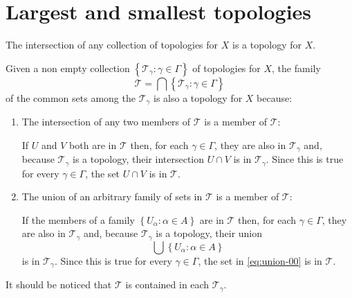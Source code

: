 \section{Largest and smallest topologies}

\begin{problem}
  The intersection of any collection of topologies for \(X\) is a topology for
  \(X\).
  \label{problem:the-intersection-of-topologies-is-again-a-topology}
\end{problem}

\begin{solution}
  Given a non empty collection
  \(\left\{\mathcal{T}_{\gamma}:\gamma\in\Gamma\right\}\) of topologies for
  \(X\), the family
  \[
    \mathcal{T}=\bigcap\left\{\mathcal{T}_{\gamma}:\gamma\in\Gamma\right\}
  \]
  of the common sets among the \(\mathcal{T}_{\gamma}\) is also a topology for
  \(X\) because:
  \begin{enumerate}
    \item
      The intersection of any two members of \(\mathcal{T}\) is a member of
      \(\mathcal{T}\):

      If \(U\) and \(V\) both are in \(\mathcal{T}\) then, for each
      \(\gamma\in\Gamma\), they are also in \(\mathcal{T}_{\gamma}\) and,
      because \(\mathcal{T}_{\gamma}\) is a topology, their intersection
      \(U\cap{V}\) is in \(\mathcal{T}_{\gamma}\). Since this is true for every
      \(\gamma\in\Gamma\), the set \(U\cap{V}\) is in \(\mathcal{T}\).

    \item
      The union of an arbitrary family of sets in \(\mathcal{T}\) is a member
      of \(\mathcal{T}\):

      If the members of a family \(\left\{U_{\alpha}:\alpha\in{A}\right\}\) are
      in \(\mathcal{T}\) then, for each \(\gamma\in\Gamma\), they are also in
      \(\mathcal{T}_{\gamma}\) and, because \(\mathcal{T}_{\gamma}\) is a
      topology, their union
      \begin{equation}
        \bigcup\left\{U_{\alpha}:\alpha\in{A}\right\}
        \label{eq:union-00}
      \end{equation}
      is in \(\mathcal{T}_{\gamma}\). Since this is true for every
      \(\gamma\in\Gamma\), the set in \eqref{eq:union-00} is in
      \(\mathcal{T}\).

  \end{enumerate}
  It should be noticed that \(\mathcal{T}\) is contained in each
  \(\mathcal{T}_{\gamma}\).
\end{solution}

